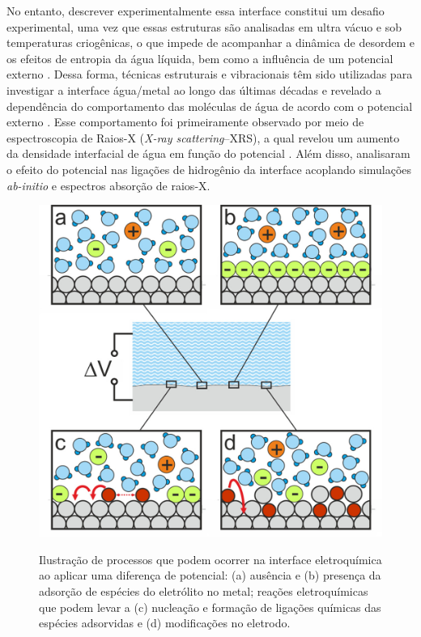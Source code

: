 No entanto, descrever experimentalmente essa interface constitui um desafio experimental, uma vez que essas estruturas são analisadas em ultra vácuo e sob temperaturas criogênicas, o que impede de acompanhar a dinâmica de desordem e os efeitos de entropia da água líquida, bem como a influência de um potencial externo \cite{review-nature}. Dessa forma, técnicas estruturais e vibracionais têm sido utilizadas para investigar a interface água/metal ao longo das últimas décadas e revelado a dependência do comportamento das moléculas de água de acordo com o potencial externo \cite{rx1,rx2,sfg1,sfg2,sfg3,sfg_kramer,raman1,raman2}. Esse comportamento foi primeiramente observado por meio de espectroscopia de Raios-X (\textit{X-ray scattering}--XRS), a qual revelou um aumento da densidade interfacial de água em função do potencial \cite{rx1}. Além disso, \citeauthor{rx2} analisaram o efeito do potencial nas ligações de hidrogênio da interface acoplando simulações \textit{ab-initio} e espectros absorção de raios-X. 


\begin{figure}[t!]
	\centering
	\caption{Ilustração de processos que podem ocorrer na interface eletroquímica ao aplicar uma diferença de potencial: (a) ausência e (b) presença da adsorção de espécies do eletrólito no metal; reações eletroquímicas que podem levar a (c) nucleação e formação de ligações químicas das espécies adsorvidas e (d)  modificações no eletrodo.}
	\includegraphics[scale=0.9]{figs/edl_figure.jpeg}
	\label{fig:edl}
\end{figure}

